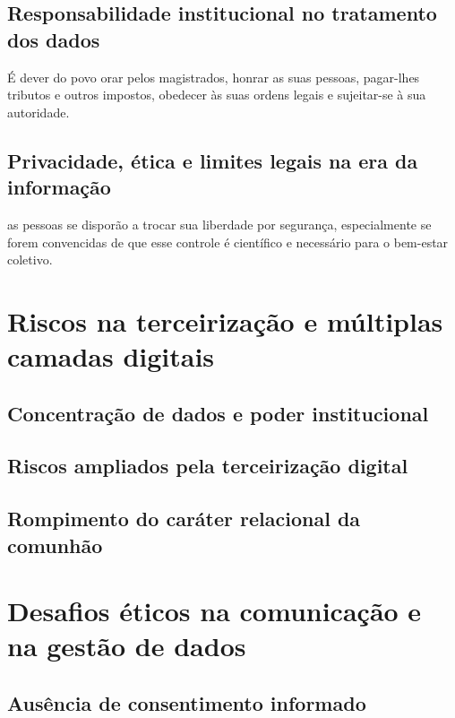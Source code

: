 \subsection{Responsabilidade institucional no tratamento dos dados}

\begin{citacao}
É dever do povo orar pelos magistrados, honrar as suas pessoas, pagar-lhes tributos e outros impostos, obedecer às suas ordens legais e sujeitar-se à sua autoridade.\cite[Cap. XXIII]{cfw}
\end{citacao}

\subsection{Privacidade, ética e limites legais na era da informação}

\begin{citacao}
as pessoas se disporão a trocar sua liberdade por segurança, especialmente se forem convencidas de que esse controle é científico e necessário para o bem-estar coletivo. \cite[p. 165]{schaeffer2002}
\end{citacao}

\section{Riscos na terceirização e múltiplas camadas digitais}

\subsection{Concentração de dados e poder institucional}

\subsection{Riscos ampliados pela terceirização digital}

\subsection{Rompimento do caráter relacional da comunhão}

\section{Desafios éticos na comunicação e na gestão de dados}

\subsection{Ausência de consentimento informado}

